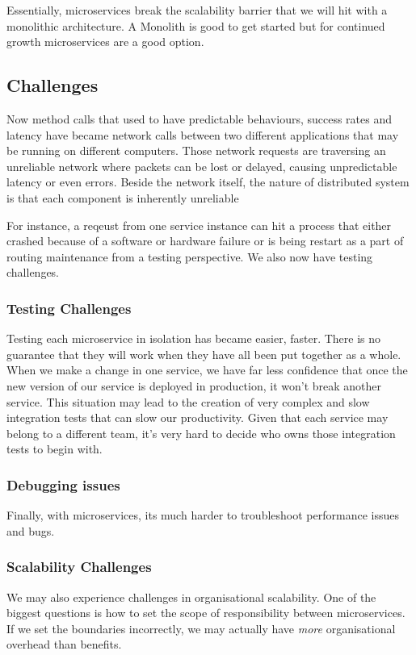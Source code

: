 Essentially, microservices break the scalability barrier that we will hit with a monolithic architecture. A Monolith is good to get started but for continued growth microservices are a good option.

\subsection{Challenges}
Now method calls that used to have predictable behaviours, success rates and latency have became network calls between two different applications that may be running on different computers.
Those network requests are traversing an unreliable network where packets can be lost or delayed, causing unpredictable latency or even errors.
Beside the network itself, the nature of distributed system is that each component is inherently unreliable

For instance, a reqeust from one service instance can hit a process that either crashed because of a software or hardware failure or is being restart as a part of routing maintenance from a testing perspective.
We also now have testing challenges.

\subsubsection{Testing Challenges}
Testing each microservice in isolation has became easier, faster.
There is no guarantee that they will work when they have all been put together as a whole.
When we make a change in one service, we have far less confidence that once the new version of our service is deployed in production, it won't break another service.
This situation may lead to the creation of very complex and slow integration tests that can slow our productivity.
Given that each service may belong to a different team, it's very hard to decide who owns those integration tests to begin with.

\subsubsection{Debugging issues}
Finally, with microservices, its much harder to troubleshoot performance issues and bugs.

\subsubsection{Scalability Challenges}
We may also experience challenges in organisational scalability.
One of the biggest questions is how to set the scope of responsibility between microservices.
If we set the boundaries incorrectly, we may actually have \textit{more} organisational overhead than benefits.


